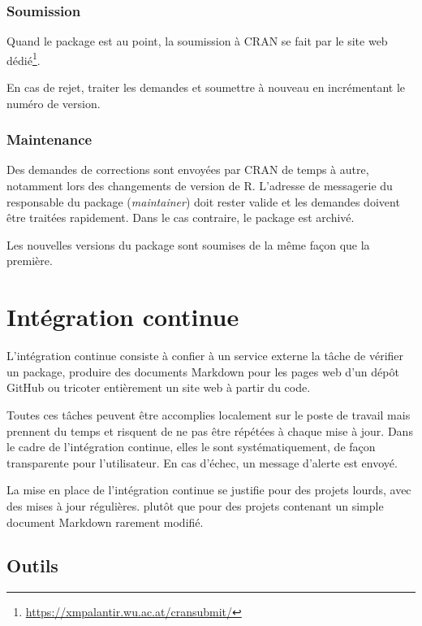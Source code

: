 \documentclass[
  12pt,
  french,
  a4paper,
  extrafontsizes,onecolumn,openright
  ]{memoir}
\begin{document}
\hypertarget{soumission}{%
\subsection{Soumission}\label{soumission}}

Quand le package est au point, la soumission à CRAN se fait par le site web dédié\footnote{\url{https://xmpalantir.wu.ac.at/cransubmit/}}.

En cas de rejet, traiter les demandes et soumettre à nouveau en incrémentant le numéro de version.

\hypertarget{maintenance}{%
\subsection{Maintenance}\label{maintenance}}

Des demandes de corrections sont envoyées par CRAN de temps à autre, notamment lors des changements de version de R.
L'adresse de messagerie du responsable du package (\emph{maintainer}) doit rester valide et les demandes doivent être traitées rapidement.
Dans le cas contraire, le package est archivé.

Les nouvelles versions du package sont soumises de la même façon que la première.

\hypertarget{chap:ci}{%
\chapter{Intégration continue}\label{chap:ci}}

L'intégration continue consiste à confier à un service externe la tâche de vérifier un package, produire des documents Markdown pour les pages web d'un dépôt GitHub ou tricoter entièrement un site web à partir du code.

Toutes ces tâches peuvent être accomplies localement sur le poste de travail mais prennent du temps et risquent de ne pas être répétées à chaque mise à jour.
Dans le cadre de l'intégration continue, elles le sont systématiquement, de façon transparente pour l'utilisateur.
En cas d'échec, un message d'alerte est envoyé.

La mise en place de l'intégration continue se justifie pour des projets lourds, avec des mises à jour régulières.
plutôt que pour des projets contenant un simple document Markdown rarement modifié.

\hypertarget{outils}{%
\section{Outils}\label{outils}}
\end{document}
